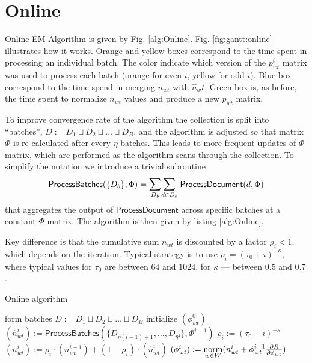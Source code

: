 \documentclass[russian,english]{llncs}
\newcommand{\norm}{\mathop{\rm norm}\limits}
\newcommand{\kw}[1]{\textsf{#1}}
\begin{document}
\section{Online}

Online EM-Algorithm is given by Fig. \ref{alg:Online}.
Fig. \ref{fig:gantt:online} illustrates how it works.
Orange and yellow boxes correspond to the time spent in processing an individual batch.
The color indicate which version of the $p^i_{wt}$ matrix was used to process each batch
(orange for even $i$, yellow for odd $i$).
Blue box correspond to the time spend in merging $n_{wt}$ with $\hat n_wt$,
Green box is, as before, the time spent to normalize $n_{wt}$ values and produce a new $p_{wt}$ matrix.

To improve convergence rate of the algorithm
the collection is split into ``batches'',
$D := D_1 \sqcup D_2 \sqcup \dots \sqcup D_B$,
and the algorithm is adjusted so that
matrix $\Phi$
is re-calculated after every $\eta$ batches.
This leads to more frequent updates of $\Phi$ matrix, which are performed as the algorithm scans through the collection.
To simplify the notation
we introduce a trivial subroutine
\[
\kw{ProcessBatches}(\{D_b\}, \Phi) = \mathlarger\sum\limits_{D_b} \mathlarger\sum\limits_{d \in D_b} \; \kw{ProcessDocument}(d, \Phi) \\
\]
that aggregates the output of $\kw{ProcessDocument}$ across specific batches at a constant $\Phi$ matrix.
The algorithm is then given by listing \ref{alg:Online}.

Key difference is that the cumulative sum $n_{wt}$ is discounted by a factor $\rho_i < 1$,
which depends on the iteration. Typical strategy is to use $\rho_i = (\tau_0 + i)^{-\kappa}$,
where typical values for $\tau_0$ are between $64$ and $1024$, for $\kappa$ --- between $0.5$ and $0.7$.

\SetAlgoSkip{}
\begin{algorithm2e}[h]
\caption{Online algorithm} %
\label{alg:Online}
\BlankLine
{}
\BlankLine
form batches $D := D_1 \sqcup D_2 \sqcup \dots \sqcup D_B$\;
initialize $(\phi^0_{wt})$\;
 {
    $(\hat n^i_{wt}) := \kw{ProcessBatches}(\{D_{\eta (i - 1) + 1}, \dots, D_{\eta i}\}, \Phi^{i - 1})$\;
    $\rho_i := (\tau_0 + i)^{-\kappa}$\;
    $(n^{i}_{wt}) := \rho_i \cdot (n^{i-1}_{wt}) + (1 - \rho_i) \cdot (\hat n^{i}_{wt})$\;
    $(\phi^{i}_{wt}) := \norm_{w \in W} (n^{i}_{wt} + \phi^{i - 1}_{wt} \frac{\partial R}{\partial \phi_{wt}})$\;
}
\end{algorithm2e}
\end{document}
